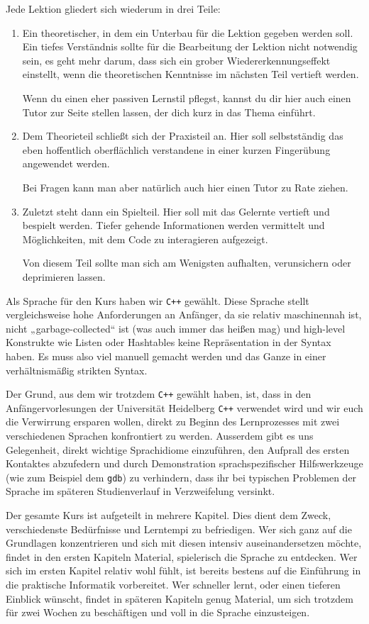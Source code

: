 \documentclass{vorkurs}
\newcommand{\swname}[1]{\texttt{#1}\xspace}
\newcommand{\Cpp}{\swname{C++}}
\begin{document}
Jede Lektion gliedert sich wiederum in drei Teile:
\begin{enumerate}
    \item Ein theoretischer, in dem ein Unterbau für die Lektion gegeben werden soll.
        Ein tiefes Verständnis sollte für die Bearbeitung der Lektion nicht notwendig sein, es geht mehr darum, dass sich ein grober Wiedererkennungseffekt einstellt, wenn die theoretischen Kenntnisse im nächsten Teil vertieft werden.

        Wenn du einen eher passiven Lernstil pflegst, kannst du dir hier auch einen Tutor zur Seite stellen lassen, der dich kurz in das Thema einführt.
    \item Dem Theorieteil schließt sich der Praxisteil an.
        Hier soll selbstständig das eben hoffentlich oberflächlich verstandene in einer kurzen Fingerübung angewendet werden.

        Bei Fragen kann man aber natürlich auch hier einen Tutor zu Rate ziehen.
    \item Zuletzt steht dann ein Spielteil. Hier soll mit das Gelernte vertieft und bespielt werden.
        Tiefer gehende Informationen werden vermittelt und Möglichkeiten, mit dem Code zu interagieren aufgezeigt.

        Von diesem Teil sollte man sich am Wenigsten aufhalten, verunsichern oder deprimieren lassen.
\end{enumerate}

Als Sprache für den Kurs haben wir \Cpp gewählt.
Diese Sprache stellt vergleichsweise hohe Anforderungen an Anfänger, da sie relativ maschinennah ist, nicht „garbage-collected“ ist (was auch immer das heißen mag) und high-level Konstrukte wie Listen oder Hashtables keine Repräsentation in der Syntax haben.
Es muss also viel manuell gemacht werden und das Ganze in einer verhältnismäßig strikten Syntax.

Der Grund, aus dem wir trotzdem \Cpp gewählt haben, ist, dass in den Anfängervorlesungen der Universität Heidelberg \Cpp verwendet wird und wir euch die Verwirrung ersparen wollen, direkt zu Beginn des Lernprozesses mit zwei verschiedenen Sprachen konfrontiert zu werden.
Ausserdem gibt es uns Gelegenheit, direkt wichtige Sprachidiome einzuführen, den Aufprall des ersten Kontaktes abzufedern und durch Demonstration sprachspezifischer Hilfswerkzeuge (wie zum Beispiel dem \swname{gdb}) zu verhindern, dass ihr bei typischen Problemen der Sprache im späteren Studienverlauf in Verzweifelung versinkt.

Der gesamte Kurs ist aufgeteilt in mehrere Kapitel. Dies dient dem Zweck, verschiedenste Bedürfnisse und Lerntempi zu befriedigen.
Wer sich ganz auf die Grundlagen konzentrieren und sich mit diesen intensiv auseinandersetzen möchte, findet in den ersten Kapiteln Material, spielerisch die Sprache zu entdecken.
Wer sich im ersten Kapitel relativ wohl fühlt, ist bereits bestens auf die Einführung in die praktische Informatik vorbereitet.
Wer schneller lernt, oder einen tieferen Einblick wünscht, findet in späteren Kapiteln genug Material, um sich trotzdem für zwei Wochen zu beschäftigen und voll in die Sprache einzusteigen.
\end{document}
